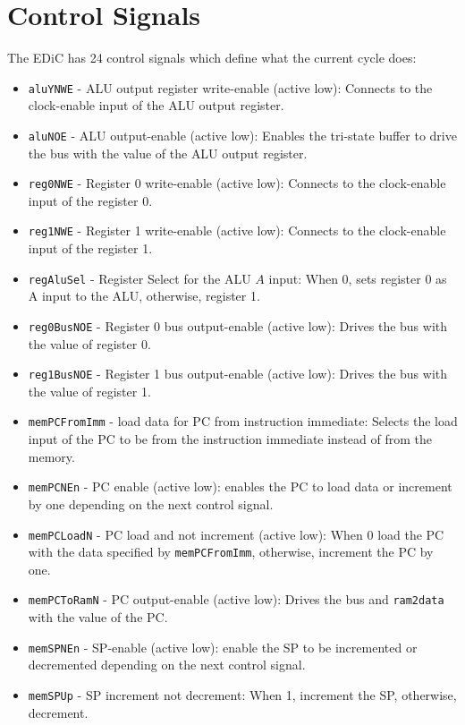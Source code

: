 \section{Control Signals}\label{sec:controlSignals}
The \gls{EDiC} has 24 control signals which define what the current cycle does:
\begin{itemize}
  \item \texttt{aluYNWE} - \gls{ALU} output register write-enable (active low): Connects to the clock-enable input of the \gls{ALU} output register.
  \item \texttt{aluNOE} - \gls{ALU} output-enable (active low): Enables the tri-state buffer to drive the bus with the value of the \gls{ALU} output register.
  \item \texttt{reg0NWE} - Register 0 write-enable (active low): Connects to the clock-enable input of the register 0.
  \item \texttt{reg1NWE} - Register 1 write-enable (active low): Connects to the clock-enable input of the register 1.
  \item \texttt{regAluSel} - Register Select for the \gls{ALU} $A$ input: When 0, sets register 0 as A input to the \gls{ALU}, otherwise, register 1.
  \item \texttt{reg0BusNOE} - Register 0 bus output-enable (active low): Drives the bus with the value of register 0.
  \item \texttt{reg1BusNOE} - Register 1 bus output-enable (active low): Drives the bus with the value of register 1.
  \item \texttt{memPCFromImm} - load data for \gls{PC} from instruction immediate: Selects the load input of the \gls{PC} to be from the instruction immediate instead of from the memory.
  \item \texttt{memPCNEn} - \gls{PC} enable (active low): enables the \gls{PC} to load data or increment by one depending on the next control signal.
  \item \texttt{memPCLoadN} - \gls{PC} load and not increment (active low): When 0 load the \gls{PC} with the data specified by \texttt{memPCFromImm}, otherwise, increment the \gls{PC} by one.
  \item \texttt{memPCToRamN} - \gls{PC} output-enable (active low): Drives the bus and \texttt{ram2data} with the value of the \gls{PC}.
  \item \texttt{memSPNEn} - \gls{SP}-enable (active low): enable the \gls{SP} to be incremented or decremented depending on the next control signal.
  \item \texttt{memSPUp} - \gls{SP} increment not decrement: When 1, increment the \gls{SP}, otherwise, decrement.

\end{itemize}
